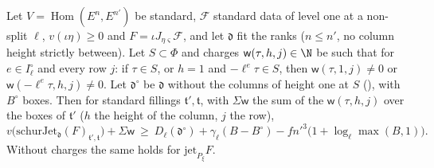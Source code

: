 \begin{theorem}
\label{der:thm:schur}
Let $V=\operatorname{Hom}(E^n,E^{n'})$ be standard, $\mathcal F$ standard data of level one at a
non-split $\ell$, $v(\iota\eta)\ge0$ and $F=\iota J_{\eta\varsigma}\mathcal F$, and let
$\mathfrak d$ fit the ranks ($n\le n'$, no column height strictly between). Let $S\subset\Phi$ and
charges $\mathsf w(\tau,h,j)\in\N$ be such that for $e\in I_\ell^\circ$ and every row $j$: if
$\tau\in S$, or $h=1$ and $-\ell^e\tau\in S$, then $\mathsf w(\tau,1,j)\ne0$ or
$\mathsf w(-\ell^e\tau,h,j)\ne0$. Let $\mathfrak d^\circ$ be $\mathfrak d$ without the columns of
height one at $S$ (), with $B^\circ$ boxes. Then for standard fillings
$\mathfrak t',\mathfrak t$, with $\Sigma\mathsf w$ the sum of the $\mathsf w(\tau,h,j)$ over the boxes
of $\mathfrak t'$ ($h$ the height of the column, $j$ the row),
\[
v\bigl(\mathrm{schurJet}_{\mathfrak d}(F)_{\mathfrak t',\mathfrak t}\bigr)+\Sigma\mathsf w\ \ge\
D_\ell(\mathfrak d^\circ)+\gamma_\ell(B-B^\circ)-fn'^3\bigl(1+\log_\ell\max(B,1)\bigr).
\]
Without charges the same holds for $\mathrm{jet}_{P_\xi}F$.
\end{theorem}

